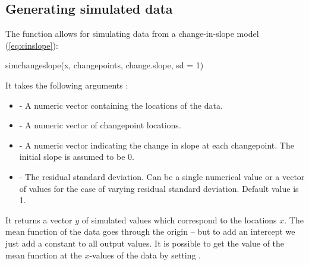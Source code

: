 \documentclass[article]{jss}
\begin{document}
\subsection{Generating simulated data}
%
%
The  function allows for simulating data from a change-in-slope model (\ref{eq:cinslope}): %
\begin{CodeInput}
simchangeslope(x, changepoints, change.slope, sd = 1)
\end{CodeInput}
%
%
It takes the following arguments :
\begin{itemize}
\item {} -  A numeric vector containing the locations of the data.
\item {} - A numeric vector of changepoint locations.
\item {} -  A numeric vector indicating the change in slope at each changepoint. The initial slope is assumed to be 0.
\item {} - The residual standard deviation. Can be a single numerical value or a vector of values for the case of varying residual standard deviation. Default value is 1.
\end{itemize}
%
%
It returns a vector $y$ of simulated values which correspond to the locations $x$. 
%
%
The mean function of the data goes through the origin -- but to add an intercept we just add a constant to all output values. It is possible to get the value of the mean function at the $x$-values of the data by setting .
\end{document}

